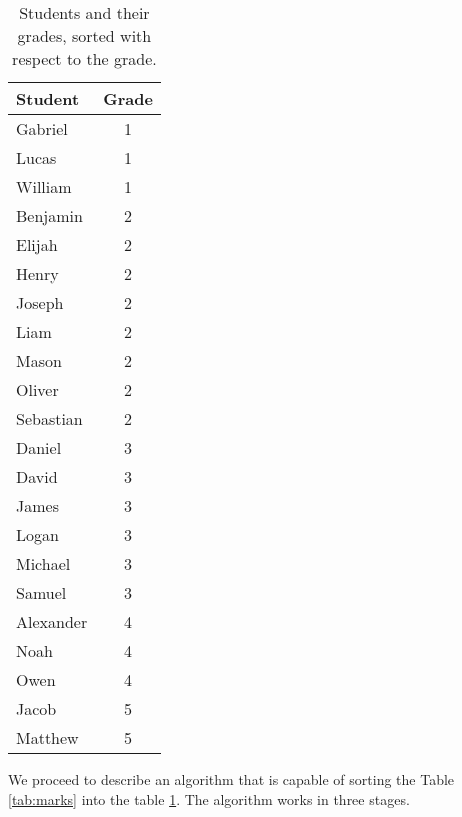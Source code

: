 \begin{table}[!ht]
  \centering
  \begin{tabular}{|l|c|}
    \hline
    Student   & Grade \\
    \hline
    \hline
    Gabriel   & 1 \\
    \hline
    Lucas     & 1 \\
    \hline
    William   & 1 \\
    \hline
    Benjamin  & 2 \\
    \hline
    Elijah    & 2 \\
    \hline
    Henry     & 2 \\
    \hline
    Joseph    & 2 \\
    \hline
    Liam      & 2 \\
    \hline
    Mason     & 2 \\
    \hline
    Oliver    & 2 \\
    \hline
    Sebastian & 2 \\
    \hline
    Daniel    & 3 \\
    \hline
    David     & 3 \\
    \hline
    James     & 3 \\
    \hline
    Logan     & 3 \\
    \hline
    Michael   & 3 \\
    \hline
    Samuel    & 3 \\
    \hline
    Alexander & 4 \\
    \hline
    Noah      & 4 \\
    \hline
    Owen      & 4 \\
    \hline
    Jacob     & 5 \\
    \hline
    Matthew   & 5 \\
    \hline
  \end{tabular}
  \caption{Students and their grades, sorted with respect to the grade.}
  \label{tab:marks-sorted}
\end{table}
We proceed to describe an algorithm that is capable of sorting the Table \ref{tab:marks} into the table
\ref{tab:marks-sorted}.  The algorithm works in three stages.
